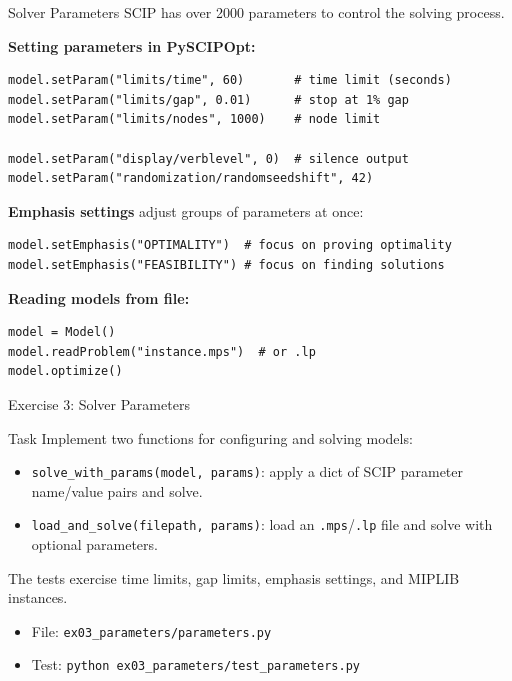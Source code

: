 \documentclass[aspectratio=169,10pt]{beamer}
\begin{document}
\begin{frame}[fragile]{Solver Parameters}
SCIP has over 2000 parameters to control the solving process.

\medskip
\textbf{Setting parameters in PySCIPOpt:}
\begin{lstlisting}
model.setParam("limits/time", 60)       # time limit (seconds)
model.setParam("limits/gap", 0.01)      # stop at 1% gap
model.setParam("limits/nodes", 1000)    # node limit

model.setParam("display/verblevel", 0)  # silence output
model.setParam("randomization/randomseedshift", 42)
\end{lstlisting}

\medskip
\textbf{Emphasis settings} adjust groups of parameters at once:
\begin{lstlisting}
model.setEmphasis("OPTIMALITY")  # focus on proving optimality
model.setEmphasis("FEASIBILITY") # focus on finding solutions
\end{lstlisting}

\medskip
\textbf{Reading models from file:}
\begin{lstlisting}
model = Model()
model.readProblem("instance.mps")  # or .lp
model.optimize()
\end{lstlisting}
\end{frame}

\begin{frame}{Exercise 3: Solver Parameters}
\begin{block}{Task}
Implement two functions for configuring and solving models:
\begin{itemize}
  \item \texttt{solve\_with\_params(model, params)}: apply a dict of SCIP parameter
        name/value pairs and solve.
  \item \texttt{load\_and\_solve(filepath, params)}: load an \texttt{.mps}/\texttt{.lp}
        file and solve with optional parameters.
\end{itemize}
The tests exercise time limits, gap limits, emphasis settings, and MIPLIB instances.
\end{block}
\begin{itemize}
  \item File: \texttt{ex03\_parameters/parameters.py}
  \item Test: \texttt{python ex03\_parameters/test\_parameters.py}
\end{itemize}
\end{frame}
\end{document}
